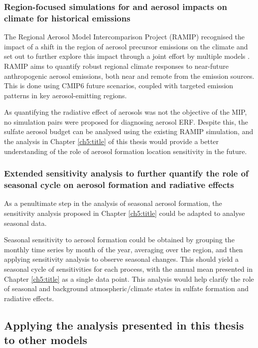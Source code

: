 \subsubsection{Region-focused simulations for  and aerosol impacts on climate for historical emissions}

The Regional Aerosol Model Intercomparison Project (RAMIP) recognised the impact of a shift in the region of aerosol precursor emissions on the climate and set out to further explore this impact through a joint effort by multiple models \citep[][]{wilcoxRegionalAerosolModel2022}. RAMIP aims to quantify robust regional climate responses to near-future anthropogenic aerosol emissions, both near and remote from the emission sources. This is done using CMIP6 future scenarios, coupled with targeted emission patterns in key aerosol-emitting regions.

As quantifying the radiative effect of aerosols was not the objective of the MIP, no simulation pairs were proposed for diagnosing aerosol ERF. Despite this, the sulfate aerosol budget can be analysed using the existing RAMIP simulation, and the analysis in Chapter \ref{ch5:title} of this thesis would provide a better understanding of the role of aerosol formation location sensitivity in the future.


\subsubsection{Extended sensitivity analysis to further quantify the role of seasonal cycle on aerosol formation and radiative effects}

As a penultimate step in the analysis of seasonal aerosol formation, the sensitivity analysis proposed in Chapter \ref{ch5:title} could be adapted to analyse seasonal data.

Seasonal sensitivity to aerosol formation could be obtained by grouping the monthly time series by month of the year, averaging over the region, and then applying sensitivity analysis to observe seasonal changes. This should yield a seasonal cycle of sensitivities for each process, with the annual mean presented in Chapter \ref{ch5:title} as a single data point. This analysis would help clarify the role of seasonal and background atmospheric/climate states in sulfate formation and radiative effects. 

\subsection{Applying the analysis presented in this thesis to other models}

